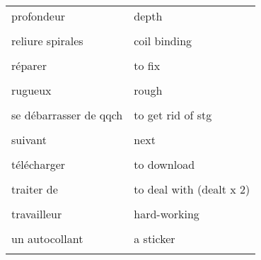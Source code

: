 \documentclass[
  10pt,
]{article}
\begin{document}
\begin{longtable}{ll}
profondeur & depth\\

\cellcolor{gray!6}{relier un livre} & \cellcolor{gray!6}{to bind a book}\\

reliure spirales & coil binding\\

\cellcolor{gray!6}{remarquer} & \cellcolor{gray!6}{to notice}\\

réparer & to fix\\

\cellcolor{gray!6}{résumer} & \cellcolor{gray!6}{to summarize}\\

rugueux & rough\\

\cellcolor{gray!6}{sécher} & \cellcolor{gray!6}{to dry}\\

se débarrasser de qqch & to get rid of stg\\

\cellcolor{gray!6}{s'intéresser à qqch} & \cellcolor{gray!6}{to be interested in stg}\\

suivant & next\\

\cellcolor{gray!6}{tard/en retard} & \cellcolor{gray!6}{late}\\

télécharger & to download\\

\cellcolor{gray!6}{téléverser} & \cellcolor{gray!6}{to upload}\\

traiter de & to deal with (dealt x 2)\\

\cellcolor{gray!6}{traiter une commande} & \cellcolor{gray!6}{to run an order}\\

travailleur & hard-working\\

\cellcolor{gray!6}{un appareil électronique} & \cellcolor{gray!6}{a device}\\

un autocollant & a sticker\\

\cellcolor{gray!6}{un bâtonnet (yeux)} & \cellcolor{gray!6}{a rod}\\


\end{longtable}
\end{document}
